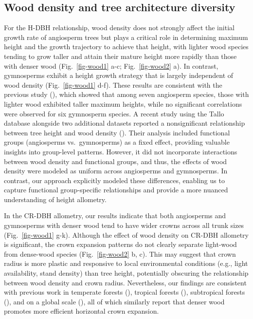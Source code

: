 \documentclass[
  12pt,
  letterpaper,
  DIV=11,
  numbers=noendperiod]{scrartcl}
\begin{document}
\subsection{Wood density and tree architecture
diversity}\label{wood-density-and-tree-architecture-diversity}

For the H-DBH relationship, wood density does not strongly affect the
initial growth rate of angiosperm trees but plays a critical role in
determining maximum height and the growth trajectory to achieve that
height, with lighter wood species tending to grow taller and attain
their mature height more rapidly than those with denser wood
(Fig.~\ref{fig-wood1} a-c; Fig.~\ref{fig-wood2} a). In contrast,
gymnosperms exhibit a height growth strategy that is largely independent
of wood density (Fig.~\ref{fig-wood1} d-f). These results are consistent
with the previous study (), which showed that among seven angiosperm species, those with
lighter wood exhibited taller maximum heights, while no significant
correlations were observed for six gymnosperm species. A recent study
using the Tallo database alongside two additional datasets reported a
nonsignificant relationship between tree height and wood density
(). Their analysis included
functional groups (angiosperms vs.~gymnosperms) as a fixed effect,
providing valuable insights into group-level patterns. However, it did
not incorporate interactions between wood density and functional groups,
and thus, the effects of wood density were modeled as uniform across
angiosperms and gymnosperms. In contrast, our approach explicitly
modeled these differences, enabling us to capture functional
group-specific relationships and provide a more nuanced understanding of
height allometry.

In the CR-DBH allometry, our results indicate that both angiosperms and
gymnosperms with denser wood tend to have wider crowns across all trunk
sizes (Fig.~\ref{fig-wood1} g-k). Although the effect of wood density on
CR-DBH allometry is significant, the crown expansion patterns do not
clearly separate light-wood from dense-wood species
(Fig.~\ref{fig-wood2} b, c). This may suggest that crown radius is more
plastic and responsive to local environmental conditions (e.g., light
availability, stand density) than tree height, potentially obscuring the
relationship between wood density and crown radius. Nevertheless, our
findings are consistent with previous work in temperate forests
(), tropical forests
(), subtropical forests
(), and on a global scale
(), all of which similarly
report that denser wood promotes more efficient horizontal crown
expansion.
\end{document}
